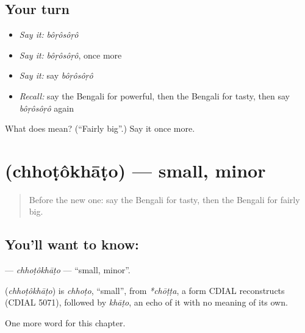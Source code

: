 \subsection*{Your turn}
\begin{itemize}
\raggedright
  \item \emph{Say it:} \emph{bôṛôsôṛô}
  \item \emph{Say it:} \emph{bôṛôsôṛô}, once more
  \item \emph{Say it:} say \emph{bôṛôsôṛô}
  \item \emph{Recall:} say the Bengali for powerful, then the Bengali for tasty, then say \emph{bôṛôsôṛô} again
\end{itemize}

\begin{tcolorbox}[breakable,colback=teal!4,colframe=teal!35!black,title={Before you move on}]
What does  mean? (\textquotedblleft{}Fairly big\textquotedblright{}.) Say it once more.
\end{tcolorbox}
\section[\texorpdfstring{\bn{ছোটখাটো} (chhoṭôkhāṭo)}{ছোটখাটো (chhoṭôkhāṭo)}]{ (chhoṭôkhāṭo) — small, minor}

\label{lesson:BN-C143-chhotokhato}



\begin{quote}
Before the new one: say the Bengali for tasty, then the Bengali for fairly big.
\end{quote}

\subsection*{You'll want to know: }
\textbf{} — \emph{chhoṭôkhāṭo} — \textquotedblleft{}small, minor\textquotedblright{}.

\begin{cousinweb}
\textbf{} (\emph{chhoṭôkhāṭo}) is \emph{chhoṭo}, \textquotedblleft{}small\textquotedblright{}, from \emph{*chōṭṭa}, a form CDIAL reconstructs (CDIAL 5071), followed by \emph{khāṭo}, an echo of it with no meaning of its own.
\end{cousinweb}

\begin{grammarlens}[title={What you've built}]
One more word for this chapter.
\end{grammarlens}

